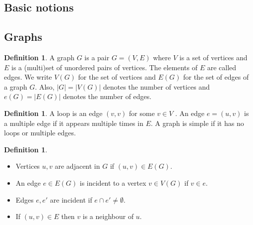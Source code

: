 \documentclass[11pt, fleqn, a4paper, landscape]{article}
\theoremstyle{plain} %
\theoremstyle{remark} %
\theoremstyle{definition} %
\newtheorem{defi}[thm]{Definition}
\begin{document}
\setlength{\abovedisplayskip}{0pt}
\setlength{\belowdisplayskip}{0pt}
\setlength{\abovedisplayshortskip}{0pt}
\setlength{\belowdisplayshortskip}{0pt}

\begin{multicols}{3}

\section{Basic notions}
\subsection{Graphs}
\begin{defi}
A graph $G$ is a pair $G = (V,E)$ where $V$ is a set of vertices and $E$ is a (multi)set of unordered pairs of vertices. The elements of $E$ are called edges. We write $V (G)$ for the set of vertices and $E(G)$ for the set of edges of a graph $G$. Also, $|G| = |V (G)|$ denotes the number of
vertices and $e(G) = |E(G)|$ denotes the number of edges.
\end{defi}
\begin{defi}
A loop is an edge $(v, v)$ for some $v\in V$ . An edge $e = (u, v)$ is a multiple edge if it appears multiple times in $E$. A graph is simple if it has no loops or multiple edges.
\end{defi}
\begin{defi}
\begin{itemize}
\item Vertices $u, v$ are adjacent in $G$ if $(u, v)\in E(G)$.
\item An edge $e \in E(G)$ is incident to a vertex $v \in V (G)$ if $v \in e$.
\item Edges $e, e'$ are incident if $e\cap e'\ne \emptyset$.
\item If $(u, v) \in E $ then $v$ is a neighbour of $u$.
\end{itemize}
\end{defi}
\addtocounter{thm}{1}


\end{multicols}
\end{document}
